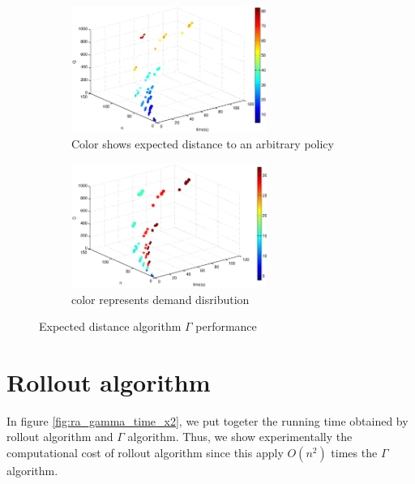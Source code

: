 \begin{figure}[!htbp]
  \begin{center}
  \begin{subfigure}[h]{1\textwidth}
   \includegraphics[width=0.7\textwidth]{Images/Chapter5/expected_distance3D.eps}
   \caption{Color shows expected distance to an arbitrary policy }\label{fig:expected_distance3D_time}
  \end{subfigure}
  \begin{subfigure}[h]{1\textwidth}
   \includegraphics[width=0.7\textwidth]{Images/Chapter5/expected_distance3D_range.eps}
   \caption{color represents demand disribution}\label{fig:expected_distance3D_range_time}
  \end{subfigure}
   
  \end{center}
    \caption{Expected distance algorithm  $\Gamma$ performance}\label{fig:expected_distance3D}
\end{figure}

\clearpage

\section{Rollout algorithm}

In figure \ref{fig:ra_gamma_time_x2}, we put togeter the running time obtained by rollout algorithm and $\Gamma$ algorithm. Thus, we show experimentally the computational cost of rollout algorithm since this apply $O(n^2)$ times the $\Gamma$ algorithm.


